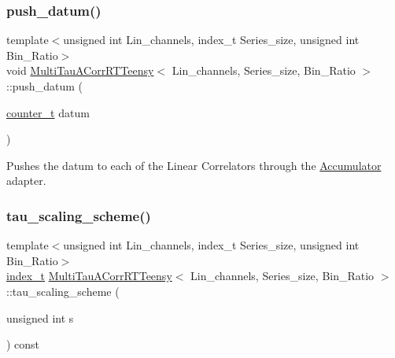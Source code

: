 \mbox{\label{classMultiTauACorrRTTeensy_a85777a221b7a15de34b252ed804ab0f8}} 
\subsubsection{\texorpdfstring{push\+\_\+datum()}{push\_datum()}}
{\footnotesize\ttfamily template$<$unsigned int Lin\+\_\+channels, index\+\_\+t Series\+\_\+size, unsigned int Bin\+\_\+\+Ratio$>$ \\
void \hyperlink{classMultiTauACorrRTTeensy}{Multi\+Tau\+A\+Corr\+R\+T\+Teensy}$<$ Lin\+\_\+channels, Series\+\_\+size, Bin\+\_\+\+Ratio $>$\+::push\+\_\+datum (\begin{DoxyParamCaption}\item[{\hyperlink{types_8hpp_a22f279793847eba127de149437848c48}{counter\+\_\+t}}]{datum }\end{DoxyParamCaption})\hspace{0.3cm}{\ttfamily [inline]}}



Pushes the datum to each of the Linear Correlators through the \hyperlink{classAccumulator}{Accumulator} adapter. 

\mbox{\label{classMultiTauACorrRTTeensy_a1a677c901b40aecdd00a4f2135d8c2bb}} 
\subsubsection{\texorpdfstring{tau\+\_\+scaling\+\_\+scheme()}{tau\_scaling\_scheme()}}
{\footnotesize\ttfamily template$<$unsigned int Lin\+\_\+channels, index\+\_\+t Series\+\_\+size, unsigned int Bin\+\_\+\+Ratio$>$ \\
\hyperlink{types_8hpp_a7c40bb931c31595ed6308605f4537447}{index\+\_\+t} \hyperlink{classMultiTauACorrRTTeensy}{Multi\+Tau\+A\+Corr\+R\+T\+Teensy}$<$ Lin\+\_\+channels, Series\+\_\+size, Bin\+\_\+\+Ratio $>$\+::tau\+\_\+scaling\+\_\+scheme (\begin{DoxyParamCaption}\item[{unsigned int}]{s }\end{DoxyParamCaption}) const\hspace{0.3cm}{\ttfamily [inline]}}



